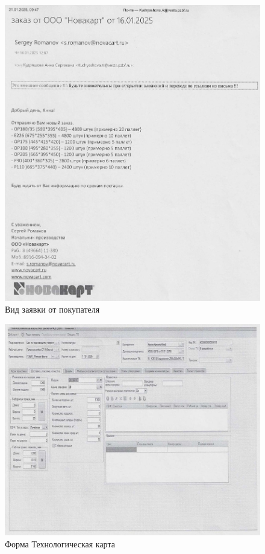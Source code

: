%
\begin{figure}
\begin{center}
\includegraphics[height=0.7\textheight, keepaspectratio]{Pics/I.2..jpg}
\end{center}
\caption{Вид заявки от покупателя}
\label{pic:I.2.}
\end{figure}
\clearpage


\begin{figure}
\begin{center}
\includegraphics[height=0.5\textheight,  keepaspectratio]{Pics/II.4.jpg}
\end{center}
\caption{Форма Технологическая карта}
\label{pic:II.4.jpg}
\end{figure}
\clearpage



